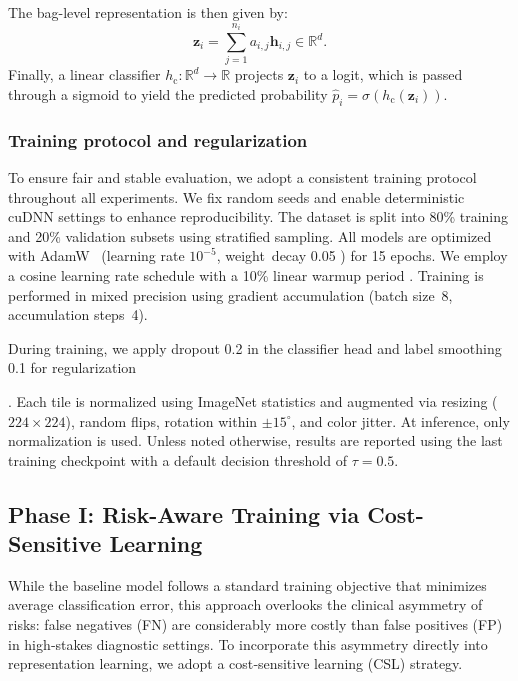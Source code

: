 \documentclass[sigconf,review,anonymous]{acmart}
\theoremstyle{remark}
\begin{document}
The bag-level representation is then given by:
\begin{equation*}
    \mathbf{z}_i = \sum_{j=1}^{n_i} a_{i,j} \mathbf{h}_{i,j} \in \mathbb{R}^{d}.
\end{equation*}
Finally, a linear classifier \( h_{\mathrm{c}}: \mathbb{R}^{d} \to \mathbb{R} \) projects \( \mathbf{z}_i \) to a logit, which is passed through a sigmoid to yield the predicted probability \(\hat{p}_i = \sigma(h_{\mathrm{c}}(\mathbf{z}_i))\).

\subsubsection{Training protocol and regularization}

To ensure fair and stable evaluation, we adopt a consistent training protocol throughout all experiments. We fix random seeds and enable deterministic cuDNN settings to enhance reproducibility. The dataset is split into 80\% training and 20\% validation subsets using stratified sampling. All models are optimized with AdamW~\cite{loshchilov2017decoupled} (learning rate $10^{-5}$, weight~{}decay 0.05 ) for 15 epochs. We employ a cosine learning rate schedule with a 10\% linear warmup period \cite{loshchilov2016sgdr}. Training is performed in mixed precision \cite{micikevicius2017mixed} using gradient accumulation (batch size~8, accumulation steps~4).

During training, we apply dropout 0.2 in the classifier head and label smoothing 0.1 for regularization 

\cite{szegedy2016rethinking}. Each tile is normalized using ImageNet statistics \cite{imagenet} and augmented via resizing ($224\times224$), random flips, rotation within $\pm 15^{\circ}$, and color jitter. At inference, only normalization is used. Unless noted otherwise, results are reported using the last training checkpoint with a default decision threshold of $\tau=0.5$.

\subsection{Phase I: Risk-Aware Training via Cost-Sensitive Learning}\label{sec:phase1_method}

While the baseline model follows a standard training objective that minimizes average classification error, this approach overlooks the clinical asymmetry of risks: false negatives (FN) are considerably more costly than false positives (FP) in high‑stakes diagnostic settings. To incorporate this asymmetry directly into representation learning, we adopt a cost‑sensitive learning (CSL) strategy.
\end{document}
